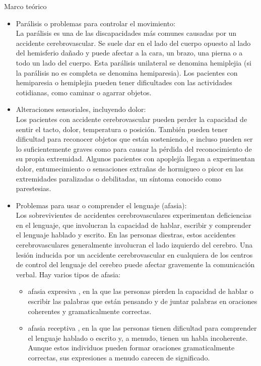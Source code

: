 \begin{thesischapter}{1} {Marco teórico}
    \begin{itemize}
        \item Parálisis o problemas para controlar el movimiento: \\
        La parálisis es una de las discapacidades más comunes causadas por un accidente
        cerebrovascular. Se suele dar en el lado del cuerpo opuesto al lado del hemisferio   dañado y
        puede afectar a la cara, un brazo, una pierna o a todo un lado del cuerpo. Esta parálisis
        unilateral se denomina hemiplejia (si la parálisis no es completa se denomina
        hemiparesia). Los pacientes con hemiparesia o hemiplejia pueden tener dificultades con
        las actividades cotidianas, como caminar o agarrar objetos.~\cite{cuidadosalpacienteadulto}
        \item Alteraciones sensoriales, incluyendo dolor:\\
        Los pacientes con accidente cerebrovascular pueden perder la capacidad de sentir
        el tacto, dolor, temperatura o posición. También pueden tener dificultad para reconocer
        objetos que están sosteniendo, e incluso pueden ser lo suficientemente graves como para
        causar la pérdida del reconocimiento de su propia extremidad. Algunos pacientes con
        apoplejía llegan a experimentan dolor, entumecimiento o sensaciones extrañas de
        hormigueo o picor en las extremidades paralizadas o debilitadas, un síntoma conocido
        como parestesias.~\cite{post-strok}
        \item Problemas para usar o comprender el lenguaje (afasia):\\
        Los sobrevivientes de accidentes cerebrovasculares experimentan deficiencias en el lenguaje, 
        que involucran la capacidad de hablar, escribir y comprender el lenguaje hablado y escrito. 
        En las personas diestras, estos accidentes cerebrovasculares generalmente involucran el lado 
        izquierdo del cerebro. Una lesión inducida por un accidente cerebrovascular en cualquiera de 
        los centros de control del lenguaje del cerebro puede afectar gravemente la comunicación verbal. 
        Hay varios tipos de afasia:~\cite{post-strok}
        \begin{itemize}
            \item afasia expresiva , en la que las personas pierden la capacidad de hablar o escribir las palabras que están pensando y de juntar palabras en oraciones coherentes y gramaticalmente correctas.
            \item afasia receptiva , en la que las personas tienen dificultad para comprender el lenguaje hablado o escrito y, a menudo, tienen un habla incoherente. Aunque estos individuos pueden formar oraciones gramaticalmente correctas, sus expresiones a menudo carecen de significado.

\end{itemize}
\end{itemize}
\end{thesischapter}
